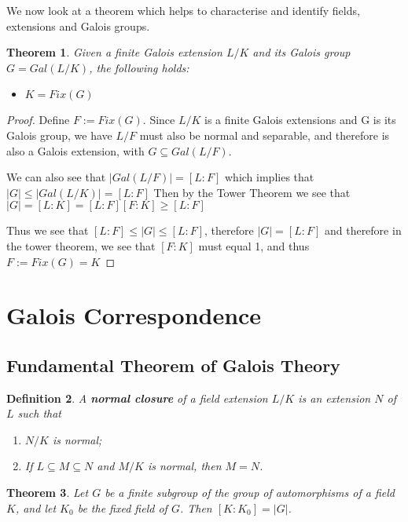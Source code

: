 \documentclass[12pt]{article}
\newtheorem{theorem}{Theorem}
\newtheorem{definition}[theorem]{Definition}
\begin{document}
\noindent We now look at a theorem which helps to characterise and identify fields, extensions and Galois groups.

\begin{theorem} \label{thm:fixed}
    Given a finite Galois extension $L/K$ and its Galois group $G=Gal(L/K)$, the following holds:
    \begin{itemize}
        \item $K = Fix(G)$
    \end{itemize}
\end{theorem}

\begin{proof}
    Define $F:=Fix(G)$. Since $L/K$ is a finite Galois extensions and G is its Galois group, we have $L/F$ must also be normal and separable, and therefore is also a Galois extension, with $G \subseteq Gal(L/F)$.

\noindent We can also see that $|Gal(L/F)| = [L:F]$ which implies that $|G|\leq|Gal(L/K)|=[L:F]$
Then by the Tower Theorem we see that $|G|=[L:K]=[L:F][F:K]\geq [L:F]$

Thus we see that $[L:F]\leq|G|\leq[L:F]$, therefore $|G|=[L:F]$ and therefore in the tower theorem, we see that $[F:K]$ must equal 1, and thus $F:=Fix(G) = K$
\end{proof}

\section{Galois Correspondence}
\subsection{Fundamental Theorem of Galois Theory}

\begin{definition}
    A \textbf{normal closure} of a field extension $L / K$ is an extension $N$ of $L$ such that 
    \begin{enumerate}
        \item $N / K$ is normal;
        \item If $L \subseteq M \subseteq N$ and $M / K$ is normal, then $M = N$.
    \end{enumerate}
\end{definition}

\begin{theorem}
    Let $G$ be a finite subgroup of the group of automorphisms of a field $K$, and let $K_0$ be the fixed field of $G$. Then $[K : K_0] = |G|$. 
\end{theorem}
\end{document}
